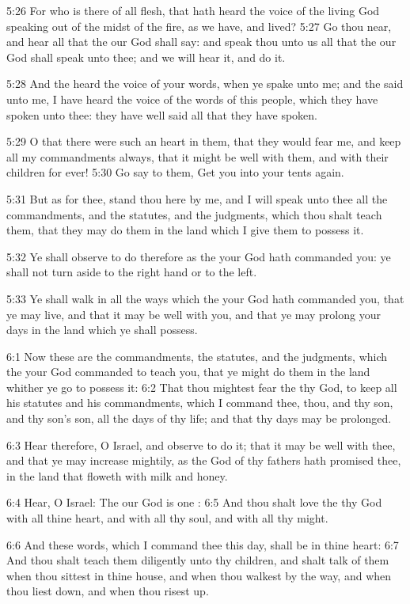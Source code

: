 5:26 For who is there of all flesh, that hath heard the voice of the
living God speaking out of the midst of the fire, as we have, and
lived?  5:27 Go thou near, and hear all that the \LORD our God shall
say: and speak thou unto us all that the \LORD our God shall speak unto
thee; and we will hear it, and do it.

5:28 And the \LORD heard the voice of your words, when ye spake unto
me; and the \LORD said unto me, I have heard the voice of the words of
this people, which they have spoken unto thee: they have well said all
that they have spoken.

5:29 O that there were such an heart in them, that they would fear me,
and keep all my commandments always, that it might be well with them,
and with their children for ever!  5:30 Go say to them, Get you into
your tents again.

5:31 But as for thee, stand thou here by me, and I will speak unto
thee all the commandments, and the statutes, and the judgments, which
thou shalt teach them, that they may do them in the land which I give
them to possess it.

5:32 Ye shall observe to do therefore as the \LORD your God hath
commanded you: ye shall not turn aside to the right hand or to the
left.

5:33 Ye shall walk in all the ways which the \LORD your God hath
commanded you, that ye may live, and that it may be well with you, and
that ye may prolong your days in the land which ye shall possess.

6:1 Now these are the commandments, the statutes, and the judgments,
which the \LORD your God commanded to teach you, that ye might do them
in the land whither ye go to possess it: 6:2 That thou mightest fear
the \LORD thy God, to keep all his statutes and his commandments, which
I command thee, thou, and thy son, and thy son's son, all the days of
thy life; and that thy days may be prolonged.

6:3 Hear therefore, O Israel, and observe to do it; that it may be
well with thee, and that ye may increase mightily, as the \LORD God of
thy fathers hath promised thee, in the land that floweth with milk and
honey.

6:4 Hear, O Israel: The \LORD our God is one \LORD: 6:5 And thou shalt
love the \LORD thy God with all thine heart, and with all thy soul, and
with all thy might.

6:6 And these words, which I command thee this day, shall be in thine
heart: 6:7 And thou shalt teach them diligently unto thy children, and
shalt talk of them when thou sittest in thine house, and when thou
walkest by the way, and when thou liest down, and when thou risest up.

